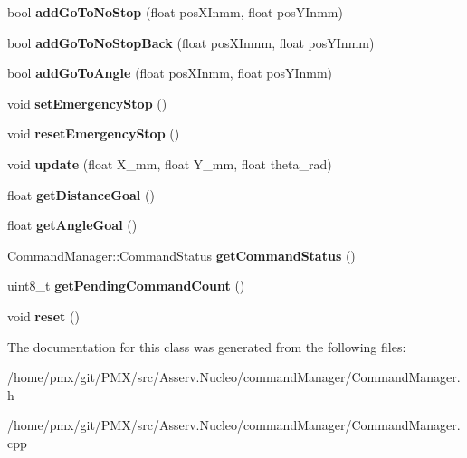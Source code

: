 \begin{DoxyCompactItemize}
bool {\bfseries add\+Go\+To\+No\+Stop} (float pos\+X\+Inmm, float pos\+Y\+Inmm)
\item 
\mbox{\label{classCommandManager_aab5cc6154f1076e96ebb04866dd21781}} 
bool {\bfseries add\+Go\+To\+No\+Stop\+Back} (float pos\+X\+Inmm, float pos\+Y\+Inmm)
\item 
\mbox{\label{classCommandManager_a84accd6c31ed17af32502b8525b1eeb8}} 
bool {\bfseries add\+Go\+To\+Angle} (float pos\+X\+Inmm, float pos\+Y\+Inmm)
\item 
\mbox{\label{classCommandManager_a4303783323d4a4ac027b860dfdc7103c}} 
void {\bfseries set\+Emergency\+Stop} ()
\item 
\mbox{\label{classCommandManager_abb744a831796bd275d3ab509f1f71ad9}} 
void {\bfseries reset\+Emergency\+Stop} ()
\item 
\mbox{\label{classCommandManager_a8c62dfba1fcad3c79fe4252fffb5c2d0}} 
void {\bfseries update} (float X\+\_\+mm, float Y\+\_\+mm, float theta\+\_\+rad)
\item 
\mbox{\label{classCommandManager_a06eedfffcfe7a21bb6fdd67f3d5494ff}} 
float {\bfseries get\+Distance\+Goal} ()
\item 
\mbox{\label{classCommandManager_ad1402c1d802d5dd184022470d144bf96}} 
float {\bfseries get\+Angle\+Goal} ()
\item 
\mbox{\label{classCommandManager_ad3536e6122f76e12e8f40907ab9cc48b}} 
Command\+Manager\+::\+Command\+Status {\bfseries get\+Command\+Status} ()
\item 
\mbox{\label{classCommandManager_a95d38725985bb41c0e26d191068afd44}} 
uint8\+\_\+t {\bfseries get\+Pending\+Command\+Count} ()
\item 
\mbox{\label{classCommandManager_a2b0fb2e7f992e0170c23968ed6a934ef}} 
void {\bfseries reset} ()
\end{DoxyCompactItemize}


The documentation for this class was generated from the following files\+:\begin{DoxyCompactItemize}
\item 
/home/pmx/git/\+P\+M\+X/src/\+Asserv.\+Nucleo/command\+Manager/Command\+Manager.\+h\item 
/home/pmx/git/\+P\+M\+X/src/\+Asserv.\+Nucleo/command\+Manager/Command\+Manager.\+cpp\end{DoxyCompactItemize}
